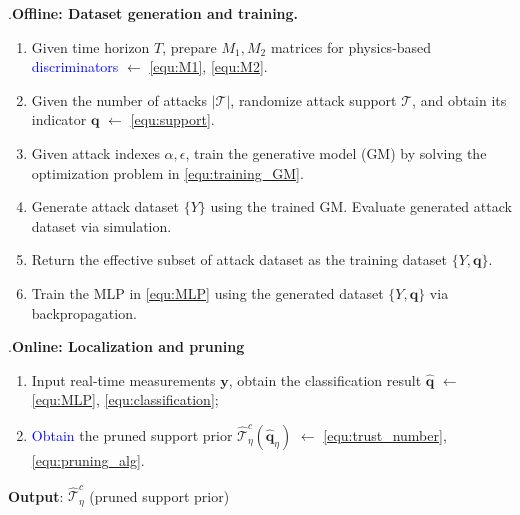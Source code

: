 \begin{algorithm}[h!]\label{Alg:ADL_AAG_P}
\SetAlgoLined
\uppercase\expandafter{}.\hspace{2mm}\textbf{Offline: Dataset generation and training.}\\
\begin{enumerate}
    \item Given time horizon $T$, prepare $M_1, M_2$ matrices for physics-based \textcolor{blue}{discriminators} $\leftarrow$ \eqref{equ:M1}, \eqref{equ:M2}.
    \item Given the number of attacks $|\mathcal{T}|$, randomize attack support $\mathcal{T}$, and obtain its indicator $\mathbf{q}$ $\leftarrow$ \eqref{equ:support}.
    \item Given attack indexes $\alpha, \epsilon$, train the generative model (GM) by solving the optimization problem in \eqref{equ:training_GM}.
    \item Generate attack dataset $\{Y\}$ using the trained GM. Evaluate generated attack dataset via simulation.
    \item Return the effective subset of attack dataset as the training dataset $\{Y, \mathbf{q}\}$.
    \item Train the MLP in \eqref{equ:MLP} using the generated dataset $\{Y, \mathbf{q}\}$ via backpropagation.
\end{enumerate}

\uppercase\expandafter{}.\hspace{2mm}\textbf{Online: Localization and pruning}\\
\begin{enumerate}
    \item Input real-time measurements $\mathbf{y}$, obtain the classification result $\hat{\mathbf{q}}$ $\leftarrow$ \eqref{equ:MLP}, \eqref{equ:classification};
    \item \textcolor{blue}{Obtain} the pruned support prior $\hat{\mathcal{T}}^{c}_{\eta} (\hat{\mathbf{q}}_{\eta})$ $\leftarrow$ \eqref{equ:trust_number}, \eqref{equ:pruning_alg}.
\end{enumerate}

\textbf{Output}: $\hat{\mathcal{T}}^{c}_{\eta}$ (pruned support prior)
\caption{Attack detection and localization with automated attack generation and pruning}
\end{algorithm}